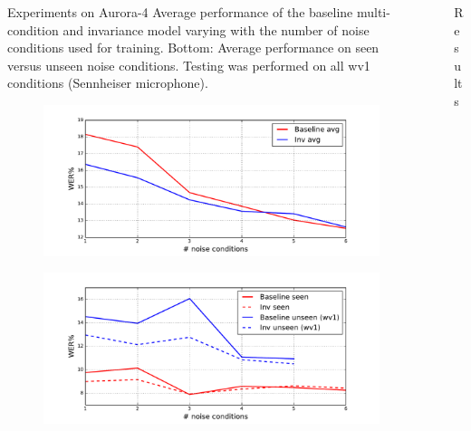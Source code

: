 \documentclass[final]{beamer}
\newlength{\sepwid}
\newlength{\onecolwid}
\newlength{\twocolwid}
\begin{document}
\begin{frame}[t]
\begin{columns}[t]
\begin{column}{\twocolwid}
\begin{columns}[t]
\begin{column}{\onecolwid}
\begin{block}{{\Large Experiments on Aurora-4}}
                Average performance of the baseline multi-condition and invariance model varying with the 
                number of noise conditions used for training. Bottom: Average performance on seen versus 
                unseen noise conditions.
                Testing was performed on all wv1 conditions (Sennheiser microphone).
                \begin{figure}
                    \centering
                    \includegraphics[width=\linewidth]{wer_avg.pdf}
                \end{figure}
                \begin{figure}
                    \centering
                    \includegraphics[width=\linewidth]{wer_seen_unseen.pdf}
                \end{figure}
            \end{block}
        \end{column} %
    \end{columns}
\end{column}

\begin{column}{\sepwid}\end{column} %
\begin{column}{\onecolwid} %
\begin{block}{Results}


\end{block}
\end{column}
\end{columns}
\end{frame}
\end{document}
